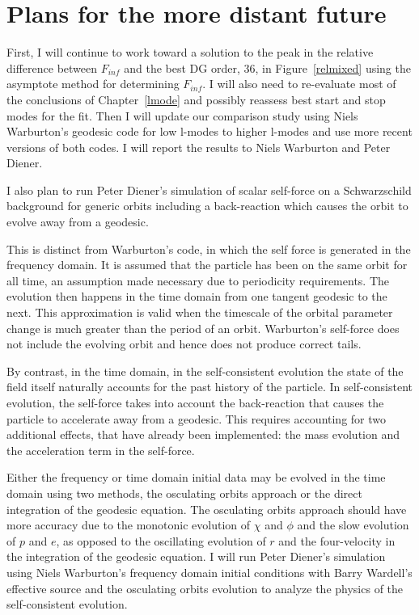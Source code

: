 \section{Plans for the more distant future}
First, I will continue to work toward a solution to the peak in the relative difference between $F_{inf}$ and the best DG order, 36, in Figure~\ref{relmixed} using the asymptote method for determining $F_{inf}$. I will also need to re-evaluate most of the conclusions of Chapter~\ref{lmode} and possibly reassess best start and stop modes for the fit. Then I will update our comparison study using Niels Warburton's geodesic code for low l-modes to higher l-modes and use more recent versions of both codes. I will report the results to Niels Warburton and Peter Diener. 

I also plan to run Peter Diener's simulation of scalar self-force on a Schwarzschild background for generic orbits including a back-reaction which causes the orbit to evolve away from a geodesic.

This is distinct from Warburton's code, in which the self force is generated in the frequency domain. It is assumed that the particle has been on the same orbit for all time, an assumption made necessary due to periodicity requirements. The evolution then happens in the time domain from one tangent geodesic to the next. This approximation is valid when the timescale of the orbital parameter change is much greater than the period of an orbit. Warburton's self-force does not include the evolving orbit and hence does not produce correct tails.

By contrast, in the time domain, in the self-consistent evolution the state of the field itself naturally accounts for the past history of the particle. In self-consistent evolution, the self-force takes into account the back-reaction that causes the particle to accelerate away from a geodesic. This requires accounting for two additional effects, that have already been implemented: the mass evolution and the acceleration term in the self-force. 


Either the frequency or time domain initial data may be evolved in the time domain using two methods, the osculating orbits approach or the direct integration of the geodesic equation. The osculating orbits approach should have more accuracy due to the monotonic evolution of $\chi$ and $\phi$ and the slow evolution of $p$ and $e$, as opposed to the oscillating evolution of $r$ and the four-velocity in the integration of the geodesic equation. I will run Peter Diener's simulation using Niels Warburton's frequency domain initial conditions with Barry Wardell's effective source and the osculating orbits evolution to analyze the physics of the self-consistent evolution. 



